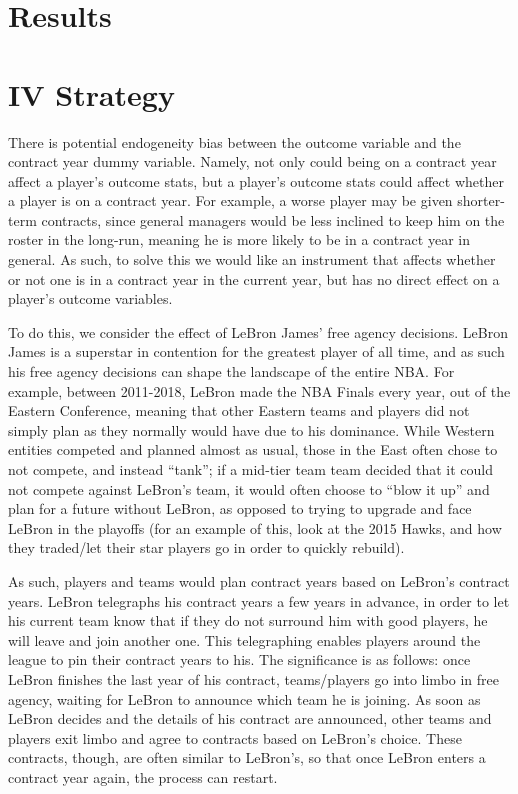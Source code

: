 \documentclass[12pt]{article}
\begin{document}
	\section{Results} \label{sec:result}

	\section{IV Strategy}
There is potential endogeneity bias between the outcome variable and the contract year dummy variable. Namely, not only could being on a contract year affect a player’s outcome stats, but a player’s outcome stats could affect whether a player is on a contract year. For example, a worse player may be given shorter-term contracts, since general managers would be less inclined to keep him on the roster in the long-run, meaning he is more likely to be in a contract year in general. As such, to solve this we would like an instrument that affects whether or not one is in a contract year in the current year, but has no direct effect on a player’s outcome variables.

	To do this, we consider the effect of LeBron James’ free agency decisions. LeBron James is a superstar in contention for the greatest player of all time, and as such his free agency decisions can shape the landscape of the entire NBA. For example, between 2011-2018, LeBron made the NBA Finals every year, out of the Eastern Conference, meaning that other Eastern teams and players did not simply plan as they normally would have due to his dominance. While Western entities competed and planned almost as usual, those in the East often chose to not compete, and instead “tank”; if a mid-tier team team decided that it could not compete against LeBron’s team, it would often choose to “blow it up” and plan for a future without LeBron, as opposed to trying to upgrade and face LeBron in the playoffs (for an example of this, look at the 2015 Hawks, and how they traded/let their star players go in order to quickly rebuild).

As such, players and teams would plan contract years based on LeBron’s contract years. LeBron telegraphs his contract years a few years in advance, in order to let his current team know that if they do not surround him with good players, he will leave and join another one. This telegraphing enables players around the league to pin their contract years to his. The significance is as follows: once LeBron finishes the last year of his contract, teams/players go into limbo in free agency, waiting for LeBron to announce which team he is joining. As soon as LeBron decides and the details of his contract are announced, other teams and players exit limbo and agree to contracts based on LeBron’s choice. These contracts, though, are often similar to LeBron’s, so that once LeBron enters a contract year again, the process can restart. 
\end{document}
